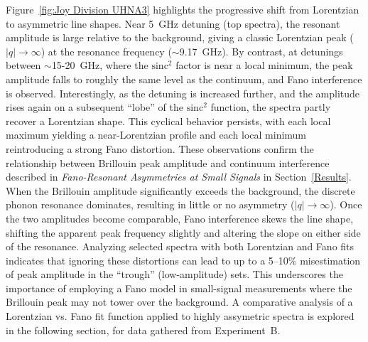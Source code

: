 Figure~\ref{fig:Joy Division UHNA3} highlights the progressive shift from Lorentzian to asymmetric line shapes. Near \SI{5}{\giga\hertz} detuning (top spectra), the resonant amplitude is large relative to the background, giving a classic Lorentzian peak (\(|q| \to \infty\)) at the resonance frequency (\(\sim\)\SI{9.17}{\giga\hertz}). By contrast, at detunings between \(\sim\)15-\SI{20}{\giga\hertz}, where the \(\mathrm{sinc^{2}}\) factor is near a local minimum, the peak amplitude falls to roughly the same level as the continuum, and Fano interference is observed. Interestingly, as the detuning is increased further, and the amplitude rises again on a subsequent “lobe” of the \(\mathrm{sinc^{2}}\) function, the spectra partly recover a Lorentzian shape. This cyclical behavior persists, with each local maximum yielding a near-Lorentzian profile and each local minimum reintroducing a strong Fano distortion. These observations confirm the relationship between Brillouin peak amplitude and continuum interference described in \textit{Fano-Resonant Asymmetries at Small Signals} in Section~\ref{Results}. When the Brillouin amplitude significantly exceeds the background, the discrete phonon resonance dominates, resulting in little or no asymmetry (\(|q| \to \infty\)). Once the two amplitudes become comparable, Fano interference skews the line shape, shifting the apparent peak frequency slightly and altering the slope on either side of the resonance. Analyzing selected spectra with both Lorentzian and Fano fits indicates that ignoring these distortions can lead to up to a 5–10\% misestimation of peak amplitude in the “trough” (low-amplitude) sets. This underscores the importance of employing a Fano model in small-signal measurements where the Brillouin peak may not tower over the background. A comparative analysis of a Lorentzian vs. Fano fit function applied to highly assymetric spectra is explored in the following section, for data gathered from Experiment~B.

